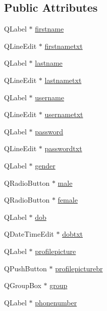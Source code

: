 \subsection*{Public Attributes}
\begin{DoxyCompactItemize}
\item 
Q\+Label $\ast$ \hyperlink{classSignUp_ae2ae2c63da54ca0eaf94b251adecbdfe}{firstname}
\item 
Q\+Line\+Edit $\ast$ \hyperlink{classSignUp_a7ea82200786963e881c8b115c04175a0}{firstnametxt}
\item 
Q\+Label $\ast$ \hyperlink{classSignUp_aa01177e983a86a9be7a1f3894e418960}{lastname}
\item 
Q\+Line\+Edit $\ast$ \hyperlink{classSignUp_a877d4c47b00e04a9cfb0092f45c0cd97}{lastnametxt}
\item 
Q\+Label $\ast$ \hyperlink{classSignUp_a00167b330798998c3d6575de385ad652}{username}
\item 
Q\+Line\+Edit $\ast$ \hyperlink{classSignUp_aeb3e4f68bd046de6788617cd8326a69c}{usernametxt}
\item 
Q\+Label $\ast$ \hyperlink{classSignUp_adf28599804795a4c204e83e60595a6bc}{password}
\item 
Q\+Line\+Edit $\ast$ \hyperlink{classSignUp_a0435d9f76f9d517e7fc25788ee2cd7d7}{passwordtxt}
\item 
Q\+Label $\ast$ \hyperlink{classSignUp_a6ab9ba662b07fce1947942ebca3eeeed}{gender}
\item 
Q\+Radio\+Button $\ast$ \hyperlink{classSignUp_a70170aac5db032656bca3001f711ea9f}{male}
\item 
Q\+Radio\+Button $\ast$ \hyperlink{classSignUp_abb945e5760616123b5c548c7103d4e0f}{female}
\item 
Q\+Label $\ast$ \hyperlink{classSignUp_abd3feea6888e1fd608e3e0ac22604bd7}{dob}
\item 
Q\+Date\+Time\+Edit $\ast$ \hyperlink{classSignUp_aba7f06ac421cc229f10f8e485a82a61b}{dobtxt}
\item 
Q\+Label $\ast$ \hyperlink{classSignUp_a765e63e4a135b5063f753d0a3e928a18}{profilepicture}
\item 
Q\+Push\+Button $\ast$ \hyperlink{classSignUp_a4bcba614d25f1498bf75367ccf566bfa}{profilepicturebr}
\item 
Q\+Group\+Box $\ast$ \hyperlink{classSignUp_a4cbbcbee8c5a0a3176de6d67efb02511}{group}
\item 
Q\+Label $\ast$ \hyperlink{classSignUp_ad9798c6c90208bacac4a99355bf7cbf3}{phonenumber}
\item 

\end{DoxyCompactItemize}
